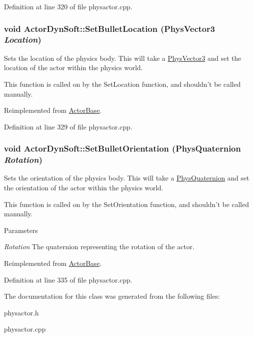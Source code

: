 Definition at line 320 of file physactor.cpp.\hypertarget{classActorDynSoft_aaf548f7849f59956c10d79420efafffb}{
\subsubsection[{SetBulletLocation}]{\setlength{\rightskip}{0pt plus 5cm}void ActorDynSoft::SetBulletLocation ({\bf PhysVector3} {\em Location})}}
\label{dc/de0/classActorDynSoft_aaf548f7849f59956c10d79420efafffb}


Sets the location of the physics body. This will take a \hyperlink{classPhysVector3}{PhysVector3} and set the location of the actor within the physics world. \par
 This function is called on by the SetLocation function, and shouldn't be called manually. 

Reimplemented from \hyperlink{classActorBase_af64a57138bbd32c52581a5c8d0d29a76}{ActorBase}.

Definition at line 329 of file physactor.cpp.\hypertarget{classActorDynSoft_abbb2c795bd07b014239f157b440bc53d}{
\subsubsection[{SetBulletOrientation}]{\setlength{\rightskip}{0pt plus 5cm}void ActorDynSoft::SetBulletOrientation ({\bf PhysQuaternion} {\em Rotation})}}
\label{dc/de0/classActorDynSoft_abbb2c795bd07b014239f157b440bc53d}


Sets the orientation of the physics body. This will take a \hyperlink{classPhysQuaternion}{PhysQuaternion} and set the orientation of the actor within the physics world. \par
 This function is called on by the SetOrientation function, and shouldn't be called manually. 
\begin{DoxyParams}{Parameters}
\item[{\em Rotation}]The quaternion representing the rotation of the actor. \end{DoxyParams}


Reimplemented from \hyperlink{classActorBase_adf817bd5a7c562f31f6724a06a3a0f79}{ActorBase}.

Definition at line 335 of file physactor.cpp.

The documentation for this class was generated from the following files:\begin{DoxyCompactItemize}
\item 
physactor.h\item 
physactor.cpp\end{DoxyCompactItemize}
